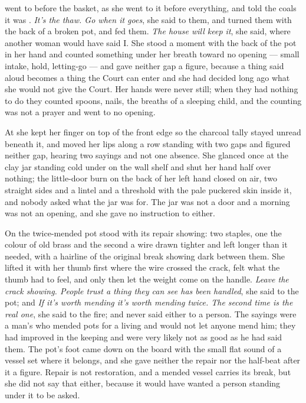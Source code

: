 \scenebreak

 went to  before the basket, as she went to it before everything, and told the coals it was . \emph{It's the thaw. Go when it goes}, she said to them, and turned them with the back of a broken pot, and fed them. \emph{The house will keep it}, she said, where another woman would have said I. She stood a moment with the back of the pot in her hand and counted something under her breath toward no opening --- small intake, hold, letting-go --- and gave neither gap a figure, because a thing said aloud becomes a thing the Court can enter and she had decided long ago what she would not give the Court. Her hands were never still; when they had nothing to do they counted spoons, nails, the breaths of a sleeping child, and the counting was not a prayer and went to no opening.

At  she kept her finger on top of the front edge so the charcoal tally stayed unread beneath it, and moved her lips along a row standing with two gaps and figured neither gap, hearing two sayings and not one absence. She glanced once at the clay jar standing cold under  on the wall shelf and shut her hand half over nothing; the little-door burn on the back of her left hand closed on air, two straight sides and a lintel and a threshold with the pale puckered skin inside it, and nobody asked what the jar was for. The jar was not a door and a morning was not an opening, and she gave no instruction to either.

On  the twice-mended pot stood with its repair showing: two staples, one the colour of old brass and the second a wire drawn tighter and left longer than it needed, with a hairline of the original break showing dark between them. She lifted it with her thumb first where the wire crossed the crack, felt what the thumb had to feel, and only then let the weight come on the handle. \emph{Leave the crack showing. People trust a thing they can see has been handled}, she said to the pot; and \emph{If it's worth mending it's worth mending twice. The second time is the real one}, she said to the fire; and never said either to a person. The sayings were a man's who mended pots for a living and would not let anyone mend him; they had improved in the keeping and were very likely not as good as he had said them. The pot's foot came down on the board with the small flat sound of a vessel set where it belongs, and she gave neither the repair nor the half-beat after it a figure. Repair is not restoration, and a mended vessel carries its break, but she did not say that either, because it would have wanted a person standing under it to be asked.

